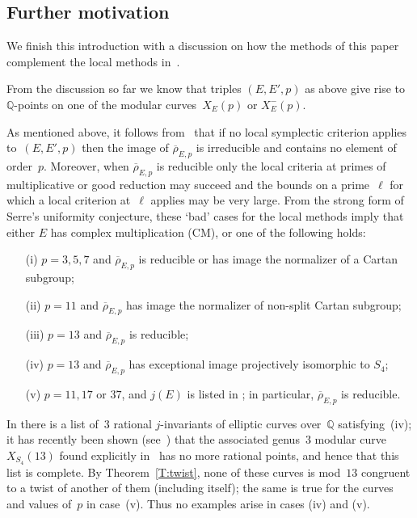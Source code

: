 \documentclass[12pt, reqno]{amsart}
\newcommand{\Q}{\mathbb{Q}}
\newcommand{\rhobar}{{\overline{\rho}}}
\numberwithin{equation}{section}
\theoremstyle{definition}
\theoremstyle{remark}
\begin{document}
\subsection{Further motivation} \label{S:motivation}
We finish this introduction with a discussion on how the methods of
this paper complement the local methods in~\cite{FKSym}.

From the discussion so far we know that triples $(E,E',p)$ as above
give rise to $\Q$-points on one of the modular curves~$X_E(p)$ or $X_E^-(p)$. 


As mentioned above, it follows from~\cite{FKSym} that if no local
symplectic criterion applies to~$(E,E',p)$ then the image of
$\rhobar_{E,p}$ is irreducible and contains no element of
order~$p$. Moreover, when $\rhobar_{E,p}$ is reducible
only the local criteria at primes of multiplicative or good reduction may
succeed and the bounds on a prime~$\ell$ for which a local
criterion at~$\ell$ applies may be very large.  From the
strong form of Serre's uniformity conjecture, these `bad' cases for
the local methods imply that either $E$ has complex multiplication
(CM), or one of the following holds:
\begin{itemize}
 \item[(i)] $p=3,5,7$ and $\rhobar_{E,p}$ is reducible or has image the normalizer of a Cartan subgroup;
 \item[(ii)] $p=11$ and $\rhobar_{E,p}$ has image the normalizer of non-split Cartan subgroup;
 \item[(iii)] $p=13$ and $\rhobar_{E,p}$ is reducible; 
 \item[(iv)] $p=13$ and $\rhobar_{E,p}$ has exceptional image projectively isomorphic to $S_4$;
 \item[(v)] $p=11,17$ or $37$, and $j(E)$ is listed
 in \cite[Table~2.1]{DahmenPhD}; in particular, $\rhobar_{E,p}$ is reducible.
\end{itemize}
In \cite[Corollary~1.9]{BarinderCrem} there is a list of~$3$ rational
$j$-invariants of elliptic curves over~$\Q$ satisfying~(iv); it has
recently been shown (see~\cite{BDMTV-S4}) that the associated
genus~$3$ modular curve~$X_{S_4}(13)$ found explicitly
in~\cite{BarinderCrem} has no more rational points, and hence that
this list is complete. By Theorem~\ref{T:twist}, none of these
curves is mod~$13$ congruent to a twist of another of them
(including itself); the same is true for the curves and values of~$p$
in case~(v). Thus no examples arise in cases (iv) and (v).
\end{document}
